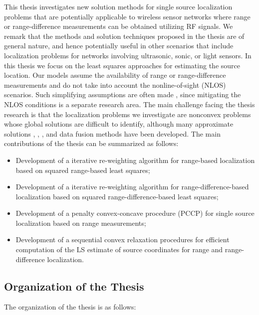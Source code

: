 This thesis investigates new solution methods for single source localization problems that are potentially applicable to wireless sensor networks where range or range-difference measurements can be obtained utilizing RF signals. We remark
that the methods and solution techniques proposed in the thesis are of general nature, and hence potentially useful in other scenarios that include localization problems for networks involving  ultrasonic, sonic, or light sensors. 
In this thesis we focus on the least squares approaches for estimating the source location. Our models assume the availability of range or range-difference measurements and do not take into account the nonline-of-sight (NLOS) scenarios. Such simplifying assumptions are often made \cite{Cheung}, \cite{classMDS} since mitigating the NLOS conditions is a separate research area. The main challenge facing the thesis research is that the localization problems we investigate
are nonconvex problems whose global solutions are difficult to identify, although many
approximate solutions \cite{Cheung}, \cite{LiHu},  \cite{SmithAbel}, and data fusion methods \cite{Sayed} have been developed. The main contributions of the thesis can be summarized as follows:

\begin{itemize}
\item
Development of a iterative re-weighting algorithm for range-based localization based on squared range-based least squares;

\item
Development of a iterative re-weighting algorithm for range-difference-based localization based on squared range-difference-based least squares;

\item
Development of a penalty convex-concave procedure (PCCP) for single source localization based on range measurements;

\item
Development of a sequential convex relaxation procedures for efficient computation of the LS estimate of source coordinates for range and range-difference localization.


\end{itemize}


\subsection{Organization of the Thesis} \label{organization}

The organization of the thesis is  as follows:

